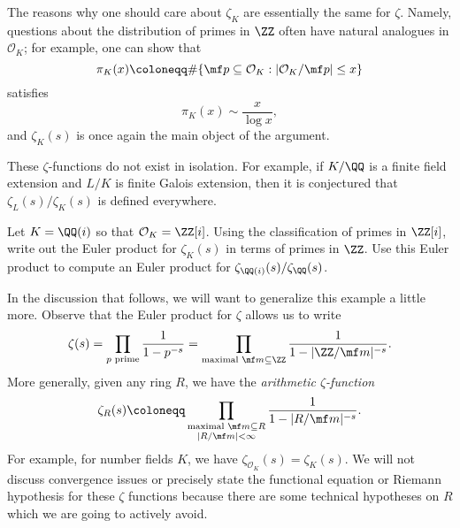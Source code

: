 \documentclass{article}
\begin{document}
The reasons why one should care about $\zeta_K$ are essentially the same for $\zeta$. Namely, questions about the distribution of primes in $\ZZ$ often have natural analogues in $\mathcal O_K$; for example, one can show that
\[\pi_K(x)\coloneqq\#\{\mf p\subseteq\mathcal O_K:|\mathcal O_K/\mf p|\le x\}\]
satisfies
\[\pi_K(x)\sim\frac x{\log x},\]
and $\zeta_K(s)$ is once again the main object of the argument.
\begin{remark}
	These $\zeta$-functions do not exist in isolation. For example, if $K/\QQ$ is a finite field extension and $L/K$ is finite Galois extension, then it is conjectured that $\zeta_L(s)/\zeta_K(s)$ is defined everywhere.
\end{remark}
\begin{exe} \label{exe:dedekindzetaforqi}
	Let $K=\QQ(i)$ so that $\mathcal O_K=\ZZ[i]$. Using the classification of primes in $\ZZ[i]$, write out the Euler product for $\zeta_K(s)$ in terms of primes in $\ZZ$. Use this Euler product to compute an Euler product for $\zeta_{\QQ(i)}(s)/\zeta_\QQ(s)$.
\end{exe}
\begin{remark} \label{rem:arithmeticzeta}
	In the discussion that follows, we will want to generalize this example a little more. Observe that the Euler product for $\zeta$ allows us to write
	\[\zeta(s)=\prod_{p\text{ prime}}\frac1{1-p^{-s}}=\prod_{\text{maximal }\mf m\subseteq\ZZ}\frac1{1-|\ZZ/\mf m|^{-s}}.\]
	More generally, given any ring $R$, we have the \textit{arithmetic $\zeta$-function}
	\[\zeta_R(s)\coloneqq\prod_{\substack{\text{maximal }\mf m\subseteq R\\|R/\mf m|<\infty}}\frac1{1-|R/\mf m|^{-s}}.\]
	For example, for number fields $K$, we have $\zeta_{\mathcal O_K}(s)=\zeta_K(s)$. We will not discuss convergence issues or precisely state the functional equation or Riemann hypothesis for these $\zeta$ functions because there are some technical hypotheses on $R$ which we are going to actively avoid.
\end{remark}
\end{document}

